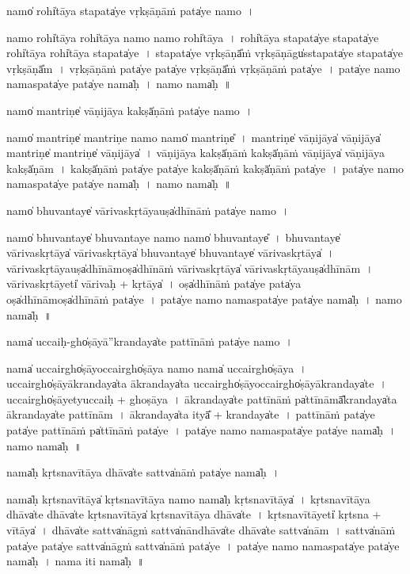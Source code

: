 \documentclass[parskip, DIV=14]{scrartcl}
\begin{document}
{\vspace{0.5cm}
namo̍ rohi̍tāya sta॒pata̍ye vṛ॒kṣāṇā॒ṁ  pata̍ye॒ namo॒~।

namo॒ rohi̍tāya॒ rohi̍tāya॒ namo॒ namo॒ rohi̍tāya~।
rohi̍tāya sta॒pata̍ye sta॒pata̍ye॒ rohi̍tāya॒ rohi̍tāya sta॒pata̍ye~।
sta॒pata̍ye vṛ॒kṣāṇā̎ṁ vṛ॒kṣāṇāgu̍ssta॒pata̍ye sta॒pata̍ye vṛ॒kṣāṇā̎m~।
vṛ॒kṣāṇā॒ṁ pata̍ye॒ pata̍ye vṛ॒kṣāṇā̎ṁ vṛ॒kṣāṇā॒ṁ pata̍ye~।
pata̍ye॒ namo॒ nama॒spata̍ye॒ pata̍ye॒ nama̍ḥ~।
namo॒ nama̍ḥ~॥ 

\vspace{0.5cm}
namo̍ ma॒ntriṇe̍ vāṇi॒jāya॒ kakṣā̍ṇā॒ṁ pata̍ye॒ namo॒~।

namo̍ ma॒ntriṇe̍ ma॒ntriṇe॒ namo॒ namo̍ ma॒ntriṇe̎~।
ma॒ntriṇe̍ vāṇi॒jāya̍ vāṇi॒jāya̍ ma॒ntriṇe̍ ma॒ntriṇe̍ vāṇi॒jāya̍~।
vā॒ṇi॒jāya॒ kakṣā̍ṇā॒ṁ kakṣā̍ṇāṁ vāṇi॒jāya̍ vāṇi॒jāya॒ kakṣā̍ṇām~।
kakṣā̍ṇā॒ṁ pata̍ye॒ pata̍ye॒ kakṣā̍ṇā॒ṁ kakṣā̍ṇā॒ṁ pata̍ye~।
pata̍ye॒ namo॒ nama॒spata̍ye॒ pata̍ye॒ nama̍ḥ~।
namo॒ nama̍ḥ~॥ 

\vspace{0.5cm}
namo̍ bhuva॒ntaye̍ vārivaskṛ॒tāyauṣa̍dhīnā॒ṁ pata̍ye॒ namo॒~।

namo̍ bhuva॒ntaye̍ bhuva॒ntaye॒ namo॒ namo̍ bhuva॒ntaye̎~।
bhu॒va॒ntaye̍ vārivaskṛ॒tāya̍ vārivaskṛ॒tāya̍ bhuva॒ntaye̍ bhuva॒ntaye̍ vārivaskṛ॒tāya̍~।
vā॒ri॒va॒skṛ॒tāyauṣa̍dhīnā॒moṣa̍dhīnāṁ vārivaskṛ॒tāya̍ vārivaskṛ॒tāyauṣa̍dhīnām~।
vā॒ri॒va॒skṛ॒tāyeti̍ vārivaḥ + kṛ॒tāya̍~।
oṣa̍dhīnā॒ṁ pata̍ye॒ pata̍ya॒ oṣa̍dhīnā॒moṣa̍dhīnā॒ṁ pata̍ye~।
pata̍ye॒ namo॒ nama॒spata̍ye॒ pata̍ye॒ nama̍ḥ~।
namo॒ nama̍ḥ~॥ 

\vspace{0.5cm}
nama̍ u॒ccaiḥ-gho̍ṣāyā''kra॒ndaya̍te pattī॒nāṁ  pata̍ye॒ namo॒~।

nama̍  u॒ccairgho̍ṣāyo॒ccairgho̍ṣāya॒ namo॒ nama̍ u॒ccairgho̍ṣāya~।
u॒ccairgho̍ṣāyākra॒ndaya̍ta ākra॒ndaya̍ta u॒ccairgho̍ṣāyo॒ccairgho̍ṣāyākra॒ndaya̍te~।
u॒ccairgho̍ṣā॒yetyu॒ccaiḥ + gho॒ṣā॒ya॒~।
ā॒kra॒ndaya̍te pattī॒nāṁ pa̍ttī॒nāmā̎kra॒ndaya̍ta ākra॒ndaya̍te pattī॒nām~।
ā॒kra॒ndaya̍ta॒ ityā̎ + kra॒ndaya̍te~।
pa॒ttī॒nāṁ pata̍ye॒ pata̍ye pattī॒nāṁ pa̍ttī॒nāṁ pata̍ye~।
pata̍ye॒ namo॒ nama॒spata̍ye॒ pata̍ye॒ nama̍ḥ~।
namo॒ nama̍ḥ~॥ 

\vspace{0.5cm}
nama̍ḥ kṛtsnavī॒tāya॒ dhāva̍te॒ sattva̍nā॒ṁ  pata̍ye॒ nama̍ḥ~।

nama̍ḥ kṛtsnavī॒tāya̍ kṛtsnavī॒tāya॒ namo॒ nama̍ḥ kṛtsnavī॒tāya̍~।
kṛ॒tsna॒vī॒tāya॒ dhāva̍te॒ dhāva̍te kṛtsnavī॒tāya̍ kṛtsnavī॒tāya॒ dhāva̍te~।
kṛ॒tsna॒vī॒tāyeti̍ kṛtsna + vī॒tāya̍~।
dhāva̍te॒ sattva̍nā॒gṁ॒ sattva̍nā॒ndhāva̍te॒ dhāva̍te॒ sattva̍nām~।
sattva̍nā॒ṁ pata̍ye॒ pata̍ye॒ sattva̍nā॒gṁ॒ sattva̍nā॒ṁ pata̍ye~।
pata̍ye॒ namo॒ nama॒spata̍ye॒ pata̍ye॒ nama̍ḥ~।
nama॒ iti॒ nama̍ḥ~॥ 

}
\end{document}
